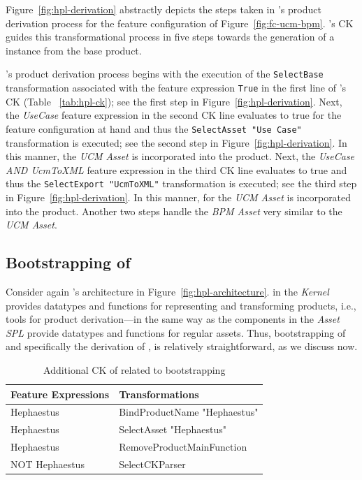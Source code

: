 
Figure~\ref{fig:hpl-derivation} abstractly depicts the steps taken in \hpl's product derivation process 
for the feature configuration of Figure~\ref{fig:fc-ucm-bpm}. \hpl{}'s CK guides this transformational process in five steps towards the generation of a \hpl{} instance from the base product.

\hpl's product derivation process begins with the execution of the \texttt{SelectBase} transformation associated with the feature expression \texttt{True} in the first line of \hpl's CK (Table ~\ref{tab:hpl-ck}); see the first step in Figure~\ref{fig:hpl-derivation}. Next, the \emph{UseCase} feature expression in the second CK line evaluates to true for the feature configuration at hand and thus the \texttt{SelectAsset "Use Case"} transformation is executed; see the second step in Figure~\ref{fig:hpl-derivation}. In this manner, the \emph{UCM Asset} is incorporated into the product. 
Next, the \emph{UseCase AND UcmToXML} feature expression in the third CK line evaluates to true and thus the \texttt{SelectExport "UcmToXML"} transformation is executed; see the third step in Figure~\ref{fig:hpl-derivation}. In this manner, \asseto{} for the \emph{UCM Asset} is incorporated into the product. Another two steps handle the \emph{BPM Asset} very similar to the \emph{UCM Asset}.


\subsection{Bootstrapping of \hpl} 
\label{sec:hpl-bootstrapping}

Consider again \hpl's architecture in Figure~\ref{fig:hpl-architecture}. \hpsplasset{} in the \emph{Kernel} provides datatypes and functions for representing and transforming \hpl{} products, i.e., tools for product derivation---in the same way as the components in the \emph{Asset SPL} provide datatypes and functions for regular assets. Thus, bootstrapping of \hpl{} and specifically the derivation of \hpproduct, is relatively straightforward, as we discuss now.


\begin{table}[t!]
\begin{center}
\begin{tabular}{||l||l||}
  \hline
  \textbf{Feature Expressions} & \textbf{Transformations}   \\  \hline
  Hephaestus & BindProductName "Hephaestus" \\
  Hephaestus & SelectAsset "Hephaestus"   \\
  Hephaestus & RemoveProductMainFunction \\
  NOT Hephaestus & SelectCKParser \\ \hline
\end{tabular}
\caption{Additional CK of \hpl{} related to bootstrapping}
\label{tab:hplck-2}
\end{center}
\end{table}

